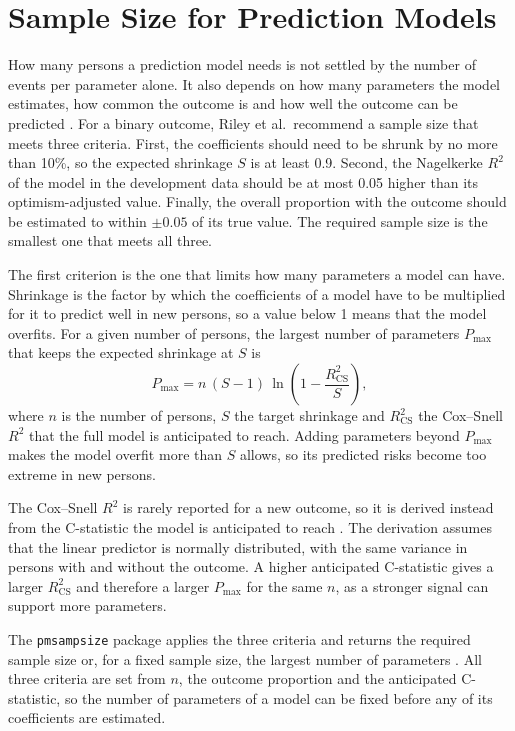 \section{Sample Size for Prediction Models}
\label{sec:tech-sample-size}

How many persons a prediction model needs is not settled by the number of events per parameter alone.
It also depends on how many parameters the model estimates, how common the outcome is and how well the outcome can be predicted \cite{riley2020samplesize}.
For a binary outcome, Riley et al.\ recommend a sample size that meets three criteria.
First, the coefficients should need to be shrunk by no more than 10\%, so the expected shrinkage $S$ is at least 0.9.
Second, the Nagelkerke $R^2$ of the model in the development data should be at most 0.05 higher than its optimism-adjusted value.
Finally, the overall proportion with the outcome should be estimated to within $\pm 0.05$ of its true value.
The required sample size is the smallest one that meets all three.

The first criterion is the one that limits how many parameters a model can have.
Shrinkage is the factor by which the coefficients of a model have to be multiplied for it to predict well in new persons, so a value below 1 means that the model overfits.
For a given number of persons, the largest number of parameters $P_{\max}$ that keeps the expected shrinkage at $S$ is
\begin{equation}
  P_{\max} = n\,(S-1)\,\ln\!\left(1 - \frac{R^2_{\mathrm{CS}}}{S}\right),
  \label{eq:tech-pmax}
\end{equation}
where $n$ is the number of persons, $S$ the target shrinkage and $R^2_{\mathrm{CS}}$ the Cox--Snell $R^2$ that the full model is anticipated to reach.
Adding parameters beyond $P_{\max}$ makes the model overfit more than $S$ allows, so its predicted risks become too extreme in new persons.

The Cox--Snell $R^2$ is rarely reported for a new outcome, so it is derived instead from the C-statistic the model is anticipated to reach \cite{riley2021cstat}.
The derivation assumes that the linear predictor is normally distributed, with the same variance in persons with and without the outcome.
A higher anticipated C-statistic gives a larger $R^2_{\mathrm{CS}}$ and therefore a larger $P_{\max}$ for the same $n$, as a stronger signal can support more parameters.

The \texttt{pmsampsize} package applies the three criteria and returns the required sample size or, for a fixed sample size, the largest number of parameters .
All three criteria are set from $n$, the outcome proportion and the anticipated C-statistic, so the number of parameters of a model can be fixed before any of its coefficients are estimated.
